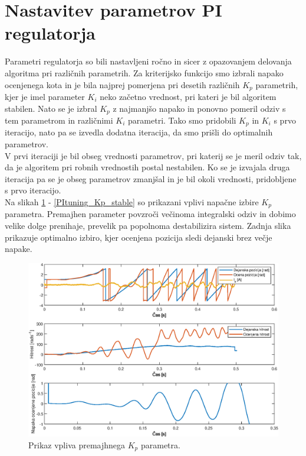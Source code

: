 \documentclass[a4paper,twoside,openright,12pt,slovene]{book}
\begin{document}
\section{Nastavitev parametrov PI regulatorja}

Parametri regulatorja so bili nastavljeni ročno in sicer z opazovanjem delovanja algoritma pri različnih parametrih. Za kriterijsko funkcijo smo izbrali napako ocenjenega kota in je bila najprej
pomerjena pri desetih različnih $K_p$ parametrih, kjer je imel parameter $K_i$ neko začetno vrednost, pri kateri je bil algoritem stabilen. Nato se je izbral $K_p$ z najmanjšo napako in ponovno pomeril
odziv s tem parametrom in različnimi $K_i$ parametri. Tako smo pridobili $K_p$ in $K_i$ s prvo iteracijo, nato pa se izvedla dodatna iteracija, da smo prišli do optimalnih parametrov. 
\\
V prvi iteraciji je bil obseg vrednosti parametrov, pri katerij se je meril odziv tak, da je algoritem pri robnih vrednostih postal nestabilen. Ko se je izvajala druga iteracija pa se je obseg
parametrov zmanjšal in je bil okoli vrednosti, pridobljene s prvo iteracijo.
\\
Na slikah \ref{PItuning_Kp_unstableLow} - \ref{PItuning_Kp_stable} so prikazani vplivi napačne izbire $K_p$ parametra. Premajhen parameter povzroči večinoma integralski odziv in dobimo velike dolge
prenihaje, prevelik pa popolnoma destabilizira sistem. Zadnja slika prikazuje optimalno izbiro, kjer ocenjena pozicija sledi dejanski brez večje napake.
\begin{figure}[!htbp]
    \centering
    \includegraphics[width=0.75\columnwidth]{Slike/PItuning_Kp_unstableLow.eps}
    \caption{\label{PItuning_Kp_unstableLow} Prikaz vpliva premajhnega $K_p$ parametra. }
\end{figure}
\end{document}
